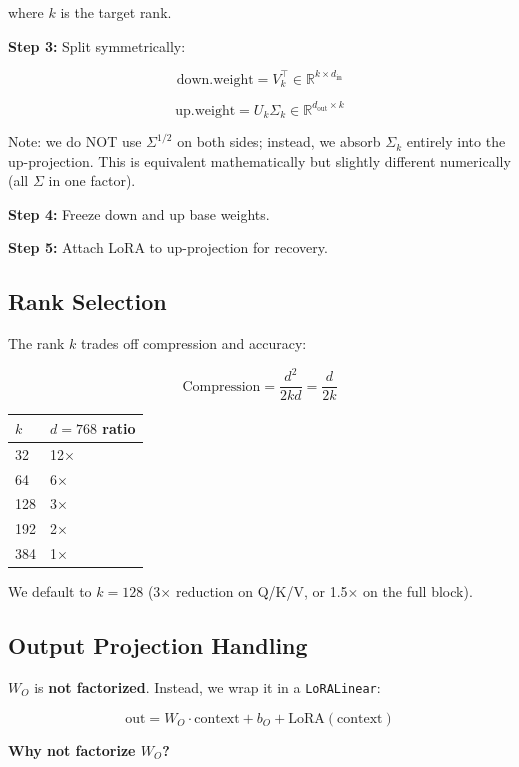 where $k$ is the target rank.

\textbf{Step 3:} Split symmetrically:

\[
\text{down.weight} = V_k^\top \in \mathbb{R}^{k \times d_\text{in}}
\]

\[
\text{up.weight} = U_k \Sigma_k \in \mathbb{R}^{d_\text{out} \times k}
\]

Note: we do NOT use $\Sigma^{1/2}$ on both sides; instead, we absorb $\Sigma_k$ 
entirely into the up-projection. This is equivalent mathematically but 
slightly different numerically (all $\Sigma$ in one factor).

\textbf{Step 4:} Freeze down and up base weights.

\textbf{Step 5:} Attach LoRA to up-projection for recovery.

\subsection{Rank Selection}

The rank $k$ trades off compression and accuracy:

\[
\text{Compression} = \frac{d^2}{2 k d} = \frac{d}{2k}
\]

\begin{table}[H]
\centering
\small
\begin{tabular}{ll}
\toprule
\textbf{$k$} & \textbf{$d = 768$ ratio} \\
\midrule
32 & 12$\times$ \\
64 & 6$\times$ \\
128 & 3$\times$ \\
192 & 2$\times$ \\
384 & 1$\times$ \\
\bottomrule
\end{tabular}
\end{table}

We default to $k = 128$ (3$\times$ reduction on Q/K/V, or 1.5$\times$ on the full block).

\subsection{Output Projection Handling}

$W_O$ is \textbf{not factorized}. Instead, we wrap it in a \texttt{LoRALinear}:

\[
\text{out} = W_O \cdot \text{context} + b_O + \text{LoRA}(\text{context})
\]

\textbf{Why not factorize $W_O$?}

